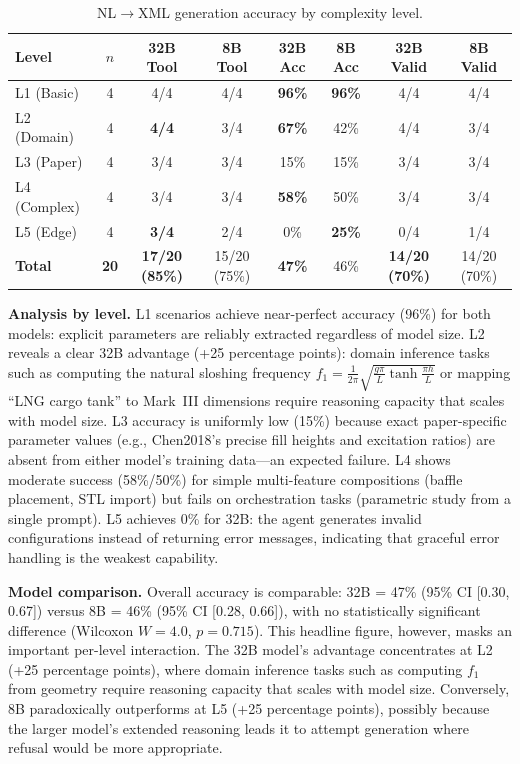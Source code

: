 \documentclass[11pt]{article}
\begin{document}
\begin{table}[htbp]
\centering
\caption{NL$\rightarrow$XML generation accuracy by complexity level.}
\label{tab:nl2xml}
\small
\begin{tabular}{@{}lccccccc@{}}
\toprule
\textbf{Level} & $n$ & \textbf{32B Tool} & \textbf{8B Tool} & \textbf{32B Acc} & \textbf{8B Acc} & \textbf{32B Valid} & \textbf{8B Valid} \\
\midrule
L1 (Basic) & 4 & 4/4 & 4/4 & \textbf{96\%} & \textbf{96\%} & 4/4 & 4/4 \\
L2 (Domain) & 4 & \textbf{4/4} & 3/4 & \textbf{67\%} & 42\% & 4/4 & 3/4 \\
L3 (Paper) & 4 & 3/4 & 3/4 & 15\% & 15\% & 3/4 & 3/4 \\
L4 (Complex) & 4 & 3/4 & 3/4 & \textbf{58\%} & 50\% & 3/4 & 3/4 \\
L5 (Edge) & 4 & \textbf{3/4} & 2/4 & 0\% & \textbf{25\%} & 0/4 & 1/4 \\
\midrule
\textbf{Total} & \textbf{20} & \textbf{17/20 (85\%)} & 15/20 (75\%) & \textbf{47\%} & 46\% & \textbf{14/20 (70\%)} & 14/20 (70\%) \\
\bottomrule
\end{tabular}
\end{table}

\textbf{Analysis by level.} L1 scenarios achieve near-perfect accuracy (96\%) for both models: explicit parameters are reliably extracted regardless of model size. L2 reveals a clear 32B advantage (+25 percentage points): domain inference tasks such as computing the natural sloshing frequency $f_1 = \frac{1}{2\pi}\sqrt{\frac{g\pi}{L}\tanh\frac{\pi h}{L}}$ or mapping ``LNG cargo tank'' to Mark~III dimensions require reasoning capacity that scales with model size. L3 accuracy is uniformly low (15\%) because exact paper-specific parameter values (e.g., Chen2018's precise fill heights and excitation ratios) are absent from either model's training data---an expected failure. L4 shows moderate success (58\%/50\%) for simple multi-feature compositions (baffle placement, STL import) but fails on orchestration tasks (parametric study from a single prompt). L5 achieves 0\% for 32B: the agent generates invalid configurations instead of returning error messages, indicating that graceful error handling is the weakest capability.

\textbf{Model comparison.} Overall accuracy is comparable: 32B = 47\% (95\% CI [0.30, 0.67]) versus 8B = 46\% (95\% CI [0.28, 0.66]), with no statistically significant difference (Wilcoxon $W = 4.0$, $p = 0.715$). This headline figure, however, masks an important per-level interaction. The 32B model's advantage concentrates at L2 (+25 percentage points), where domain inference tasks such as computing $f_1$ from geometry require reasoning capacity that scales with model size. Conversely, 8B paradoxically outperforms at L5 (+25 percentage points), possibly because the larger model's extended reasoning leads it to attempt generation where refusal would be more appropriate.
\end{document}
